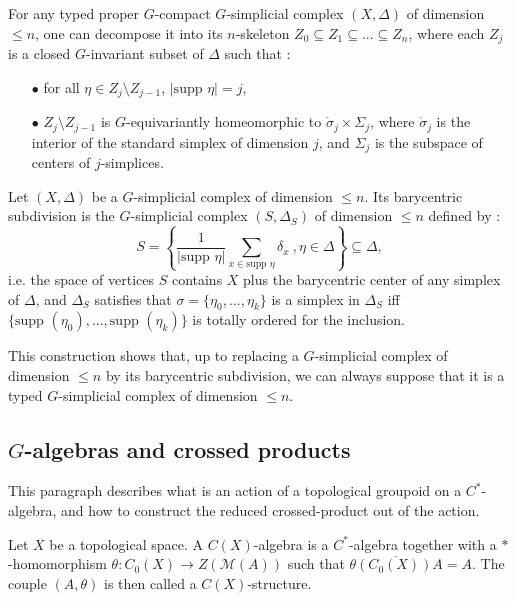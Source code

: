 For any typed proper $G$-compact $G$-simplicial complex $(X,\Delta)$ of dimension $\leq n$, one can decompose it into its $n$-skeleton $Z_0\subseteq Z_1 \subseteq ... \subseteq Z_n$, where each $Z_j$ is a closed $G$-invariant subset of $\Delta$ such that :
\begin{itemize}
\item[$\bullet$] for all $\eta \in Z_j \setminus Z_{j-1}$, $|\text{supp }\eta|= j$,
\item[$\bullet$] $Z_j \setminus Z_{j-1}$ is $G$-equivariantly homeomorphic to $\mathring\sigma_j \times \Sigma_j$, where $\mathring\sigma_j $ is the interior of the standard simplex of dimension $j$, and $\Sigma_j$ is the subspace of centers of $j$-simplices.
\end{itemize}

\begin{definition}
Let $(X,\Delta)$ be a $G$-simplicial complex of dimension $\leq n$. Its barycentric subdivision is the $G$-simplicial complex $(S,\Delta_S)$ of dimension $\leq n$ defined by :
\[S = \left\{ \frac{1}{|\text{supp } \eta|}\sum_{x\in \text{supp } \eta} \delta_x\ ,\eta\in \Delta \right\} \subseteq \Delta ,\]
i.e. the space of vertices $S$ contains $X$ plus the barycentric center of any simplex of $\Delta$, and $\Delta_S $ satisfies that $\sigma = \{ \eta_0, ...,\eta_k\}$ is a simplex in $\Delta_S$ iff $\{\text{supp }(\eta_0),...,\text{supp }(\eta_k) \}$ is totally ordered for the inclusion. %
\end{definition}

This construction shows that, up to replacing a $G$-simplicial complex of dimension $\leq n$ by its barycentric subdivision, we can always suppose that it is a typed $G$-simplicial complex of dimension $\leq n$.

\subsection{$G$-algebras and crossed products}

This paragraph describes what is an action of a topological groupoid on a $C^*$-algebra, and how to construct the reduced crossed-product out of the action.

\begin{definition}
Let $X$ be a topological space. A $C(X)$-algebra is a $C^*$-algebra together with a $*$-homomorphism $\theta : C_0(X)\rightarrow Z(\mathcal M(A))$ such that $\overline{\theta (C_0(X)) A} = A$. The couple $(A,\theta)$ is then called a $C(X)$-structure.
\end{definition} 

